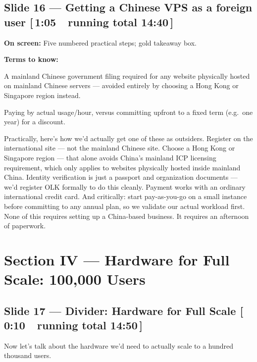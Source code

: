 \documentclass[11pt]{article}
\newcommand{\onscreen}[1]{\noindent\textbf{\color{sovGrey}On screen:} #1\par\vspace{4pt}}
\newcommand{\timing}[2]{\hfill{\normalsize\color{sovGrey}[\,#1\ \textbar\ running total #2\,]}}
\newenvironment{terms}
  {\noindent\textbf{\color{sovGrey}Terms to know:}
   \begin{description}[leftmargin=0pt,style=sameline,labelindent=0pt,itemsep=2pt,topsep=2pt,font=\normalfont\bfseries\color{sovDark}]}
  {\end{description}\vspace{2pt}}
\begin{document}
\subsection*{Slide 16 --- Getting a Chinese VPS as a foreign user \timing{1:05}{14:40}}
\onscreen{Five numbered practical steps; gold takeaway box.}
\begin{terms}
  \item[ICP license] A mainland Chinese government filing required for any website
    physically hosted on mainland Chinese servers --- avoided entirely by choosing a
    Hong Kong or Singapore region instead.
  \item[Pay-as-you-go vs.\ reserved instance] Paying by actual usage/hour, versus
    committing upfront to a fixed term (e.g.\ one year) for a discount.
\end{terms}
\begin{sayit}
Practically, here's how we'd actually get one of these as outsiders. Register on the
international site --- not the mainland Chinese site. Choose a Hong Kong or Singapore
region --- that alone avoids China's mainland ICP licensing requirement, which only
applies to websites physically hosted inside mainland China. Identity verification is
just a passport and organization documents --- we'd register OLK formally to do this
cleanly. Payment works with an ordinary international credit card. And critically: start
pay-as-you-go on a small instance before committing to any annual plan, so we validate
our actual workload first. None of this requires setting up a China-based business. It
requires an afternoon of paperwork.
\end{sayit}

\section{Section IV --- Hardware for Full Scale: 100,000 Users}

\subsection*{Slide 17 --- Divider: Hardware for Full Scale \timing{0:10}{14:50}}
\begin{sayit}
Now let's talk about the hardware we'd need to actually scale to a hundred thousand
users.
\end{sayit}
\end{document}
